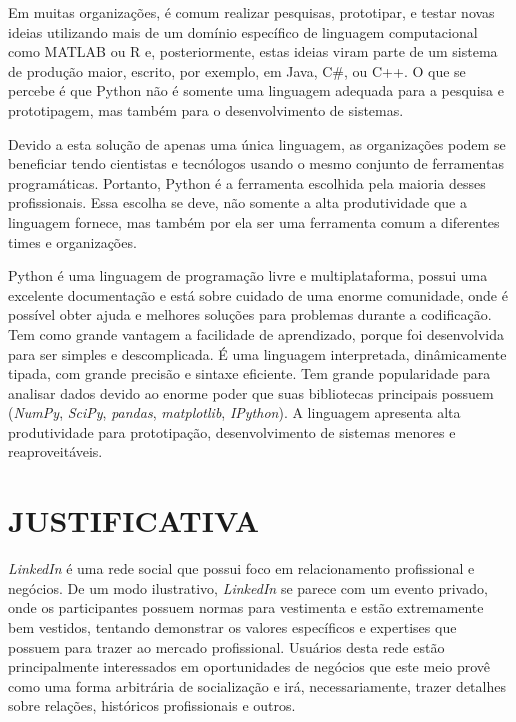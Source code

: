 Em muitas organizações, é comum realizar pesquisas, prototipar, e testar novas ideias utilizando mais de um domínio específico de linguagem computacional como MATLAB ou R e, posteriormente, estas ideias viram parte de um sistema de produção maior, escrito, por exemplo, em Java, C\#, ou C++. O que se percebe é que Python não é somente uma linguagem adequada para a pesquisa e prototipagem, mas também para o desenvolvimento de sistemas.

Devido a esta solução de apenas uma única linguagem, as organizações podem se beneficiar tendo cientistas e tecnólogos usando o mesmo conjunto de ferramentas programáticas. Portanto, Python é a ferramenta escolhida pela maioria desses profissionais. Essa escolha se deve, não somente a alta produtividade que a linguagem fornece, mas também por ela ser uma ferramenta comum a diferentes times e organizações. \cite{kaldero}

Python é uma linguagem de programação livre e multiplataforma, possui uma excelente documentação e está sobre cuidado de uma enorme comunidade, onde é possível obter ajuda e melhores soluções para problemas durante a codificação. Tem como grande vantagem a facilidade de aprendizado, porque foi desenvolvida para ser simples e descomplicada. É uma linguagem interpretada, dinâmicamente tipada, com grande precisão e sintaxe eficiente. Tem grande popularidade para analisar dados devido ao enorme poder que suas bibliotecas principais possuem (\textit{NumPy}, \textit{SciPy}, \textit{pandas}, \textit{matplotlib}, \textit{IPython}). A linguagem apresenta alta produtividade para prototipação, desenvolvimento de sistemas menores e reaproveitáveis.


\section{JUSTIFICATIVA}\label{sec:justificativa}

\textit{LinkedIn} é uma rede social que possui foco em relacionamento profissional e negócios. De um modo ilustrativo, \textit{LinkedIn} se parece com um evento privado, onde os participantes possuem normas para vestimenta e estão extremamente bem vestidos, tentando demonstrar os valores específicos e expertises que possuem para trazer ao mercado profissional. Usuários desta rede estão principalmente interessados em oportunidades de negócios que este meio provê como uma forma arbitrária de socialização e irá, necessariamente, trazer detalhes sobre relações, históricos profissionais e outros.

